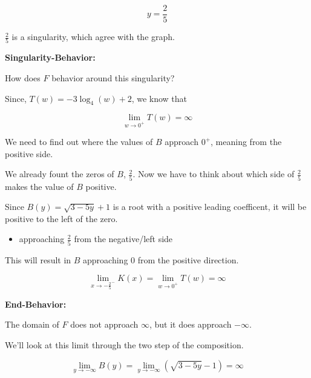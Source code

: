 \documentclass{ximera}
\begin{document}
\[
y = \frac{2}{5}
\]

$\frac{2}{5}$ is a singularity, which agree with the graph. 












\textbf{\textcolor{blue!55!black}{Singularity-Behavior:}} 

How does $F$ behavior around this singularity? 



Since, $T(w) = -3 \log_4(w) + 2$, we know that 


\[
\lim\limits_{w \to 0^+} T(w) = \infty
\]



We need to find out where the values of $B$ approach $0^+$, meaning from the positive side. 


We already fount the zeros of $B$, $\frac{2}{5}$.  Now we have to think about which side of $\frac{2}{5}$ makes the value of $B$ positive. 


Since $B(y) = \sqrt{3 - 5y} + 1$ is a root with a positive leading coefficent, it will be positive to the left of the zero. 

\begin{itemize}
\item approaching $\frac{2}{5}$ from the negative/left side
\end{itemize}

This will result in $B$ approaching $0$ from the positive direction. 



\[
\lim\limits_{x \to -\frac{2}{5}^-} K(x)  = \lim\limits_{w \to 0^+} T(w) = \infty
\]
















\textbf{\textcolor{blue!55!black}{End-Behavior:}} 

The domain of $F$ does not approach $\infty$, but it does approach $-\infty$. 


We'll look at this limit through the two step of the composition. 





\[
\lim\limits_{y \to -\infty} B(y)  = \lim\limits_{y \to -\infty} (\sqrt{3 - 5y} - 1)  = \infty
\]
\end{document}
